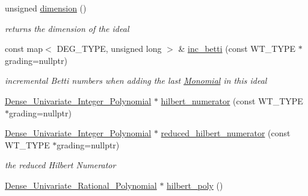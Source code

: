 \begin{Indent}
\begin{DoxyCompactItemize}
\mbox{\label{group__polygroup_a3be382128a7fc5e42b3a1cbcc226ceb9}} 
unsigned \hyperlink{group__polygroup_a3be382128a7fc5e42b3a1cbcc226ceb9}{dimension} ()
\begin{DoxyCompactList}\small\item\em returns the dimension of the ideal \end{DoxyCompactList}\item 
\mbox{\label{group__polygroup_a26ee2a655376a72284cd08ce64cbbfaa}} 
const map$<$ D\+E\+G\+\_\+\+T\+Y\+PE, unsigned long $>$ \& \hyperlink{group__polygroup_a26ee2a655376a72284cd08ce64cbbfaa}{inc\+\_\+betti} (const W\+T\+\_\+\+T\+Y\+PE $\ast$grading=nullptr)
\begin{DoxyCompactList}\small\item\em incremental Betti numbers when adding the last \hyperlink{group__polygroup_class_monomial}{Monomial} in this ideal \end{DoxyCompactList}\item 
\hyperlink{group__polygroup_class_dense___univariate___integer___polynomial}{Dense\+\_\+\+Univariate\+\_\+\+Integer\+\_\+\+Polynomial} $\ast$ \hyperlink{group__polygroup_a4baf5da74da622fa61e048552e873733}{hilbert\+\_\+numerator} (const W\+T\+\_\+\+T\+Y\+PE $\ast$grading=nullptr)
\item 
\hyperlink{group__polygroup_class_dense___univariate___integer___polynomial}{Dense\+\_\+\+Univariate\+\_\+\+Integer\+\_\+\+Polynomial} $\ast$ \hyperlink{group__polygroup_a814e71b7c8df465869708bbcdf8f6007}{reduced\+\_\+hilbert\+\_\+numerator} (const W\+T\+\_\+\+T\+Y\+PE $\ast$grading=nullptr)
\begin{DoxyCompactList}\small\item\em the reduced Hilbert Numerator \end{DoxyCompactList}\item 
\hyperlink{group__polygroup_class_dense___univariate___rational___polynomial}{Dense\+\_\+\+Univariate\+\_\+\+Rational\+\_\+\+Polynomial} $\ast$ \hyperlink{group__polygroup_a2f5e73c22e492ea016a4c7ff117cc7a3}{hilbert\+\_\+poly} ()
\end{DoxyCompactItemize}
\end{Indent}
